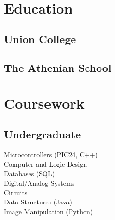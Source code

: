 \documentclass[]{deedy-resume-openfont}
\begin{document}
%
%

%
%



%
%

\begin{minipage}[t]{0.33\textwidth} 


\section{Education} 

\subsection{Union College}
\sectionsep

\subsection{The Athenian School}
\sectionsep


\section{Coursework}
\subsection{Undergraduate}
Microcontrollers (PIC24, C++) \\
Computer and Logic Design \\
Databases (SQL) \\
Digital/Analog Systems \\
Circuits \\
Data Structures (Java)\\
Image Manipulation (Python) \\
\sectionsep


\end{minipage}
\end{document}
